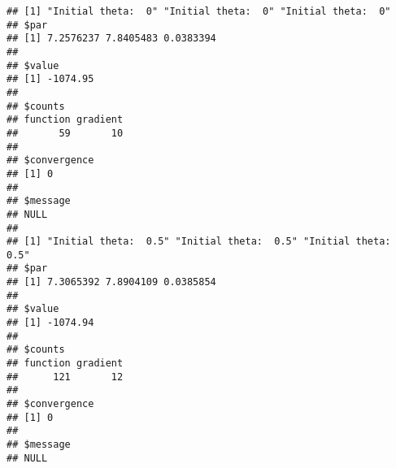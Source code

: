 \documentclass[
]{article}
\begin{document}
\begin{verbatim}
## [1] "Initial theta:  0" "Initial theta:  0" "Initial theta:  0"
## $par
## [1] 7.2576237 7.8405483 0.0383394
## 
## $value
## [1] -1074.95
## 
## $counts
## function gradient 
##       59       10 
## 
## $convergence
## [1] 0
## 
## $message
## NULL
## 
## [1] "Initial theta:  0.5" "Initial theta:  0.5" "Initial theta:  0.5"
## $par
## [1] 7.3065392 7.8904109 0.0385854
## 
## $value
## [1] -1074.94
## 
## $counts
## function gradient 
##      121       12 
## 
## $convergence
## [1] 0
## 
## $message
## NULL
\end{verbatim}
\end{document}
